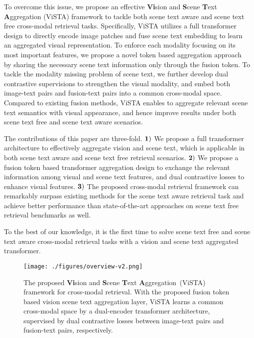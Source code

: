 \documentclass[10pt,twocolumn,letterpaper]{article}
\begin{document}
\vspace{-0.23em} 
To overcome this issue, we propose an effective \textbf{Vi}sion and \textbf{S}cene \textbf{T}ext \textbf{A}ggregation (ViSTA) framework to tackle both scene text aware and scene text free cross-modal retrieval tasks. Specifically, ViSTA utilizes a full transformer design to directly encode image patches and fuse scene text embedding to learn an aggregated visual representation. To enforce each modality focusing on its most important features, we propose a novel token based aggregation approach by sharing the necessary scene text information only through the fusion token. To tackle the modality missing problem of scene text, we further develop dual contrastive supervisions to strengthen the visual modality, and embed both image-text pairs and fusion-text pairs into a common cross-modal space. Compared to existing fusion methods, ViSTA enables to aggregate relevant scene text semantics with visual appearance, and hence improve results under both scene text free and scene text aware scenarios. 

\vspace{-0.23em}
The contributions of this paper are three-fold. $\bf{1)}$ We propose a full transformer architecture to effectively aggregate vision and scene text, which is applicable in both scene text aware and scene text free retrieval scenarios. $\bf{2)}$ We propose a fusion token based transformer aggregation design to exchange the relevant information among visual and scene text features, and dual contrastive losses to enhance visual features. $\bf{3)}$ The proposed cross-modal retrieval framework can remarkably surpass existing methods for the scene text aware retrieval task and achieve better performance than state-of-the-art approaches on scene text free retrieval benchmarks as well.

To the best of our knowledge, it is the first time to solve scene text free and scene text aware cross-modal retrieval tasks with a vision and scene text aggregated transformer.



\begin{figure*}[ht]
\begin{center}
   \texttt{[image: ./figures/overview-v2.png]}
\scriptsize   
    \end{center}\vspace{-2em}
\scriptsize
   \caption{The proposed \textbf{Vi}sion and \textbf{S}cene \textbf{T}ext \textbf{A}ggregation~(ViSTA) framework for cross-modal retrieval. With the proposed fusion token based vision scene text aggregation layer, ViSTA learns a common cross-modal space by a dual-encoder transformer architecture, supervised by dual contrastive losses between image-text pairs and fusion-text pairs, respectively.}
   \label{fig:framework}
\end{figure*}
\end{document}
